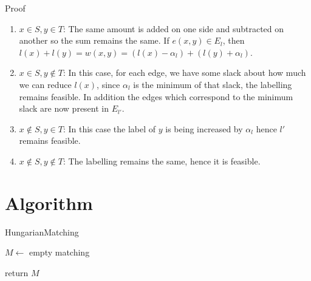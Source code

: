 Proof
\begin{enumerate}
    \item $x \in S, y \in T$: The same amount is added on one side and subtracted on another so the sum remains the same. If $e(x, y) \in E_l$, then $l(x)+l(y) = w(x, y) = (l(x)-\alpha_l)+(l(y)+\alpha_l)$.
    \item $x \in S, y \notin T$: In this case, for each edge, we have some slack about how much we can reduce $l(x)$, since $\alpha_l$ is the minimum of that slack, the labelling remains feasible. In addition the edge\/s which correspond to the minimum slack are now present in $E_{l'}$.
    \item $x \notin S, y \in T$: In this case the label of $y$ is being increased by $\alpha_l$ hence $l'$ remains feasible.
    \item $x \notin S, y \notin T$: The labelling remains the same, hence it is feasible.
\end{enumerate}

\section{Algorithm}

\begin{algorithm}[!h]
\caption{HungarianMatching}

$M \leftarrow$ empty matching



return $M$
\end{algorithm}

